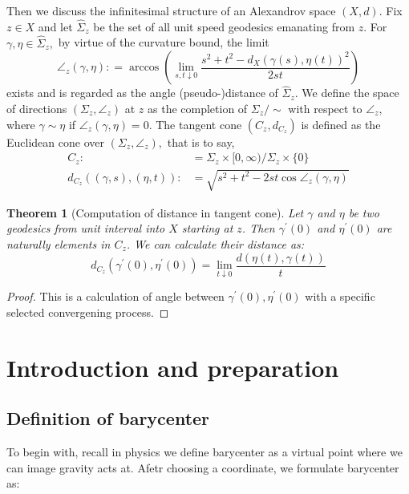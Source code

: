 \documentclass{report}
\newtheorem{thm}{Theorem}
\begin{document}
Then we discuss the infinitesimal structure of an Alexandrov space \( ( X , d ) . \) Fix \( z \in X \)
and let \( \hat { \Sigma } _ { z } \) be the set of all unit speed geodesics emanating from \( z \). For \( \gamma , \eta \in \hat { \Sigma } _ { z } , \) by virtue of the curvature bound, the limit
\[ \angle _ { z } ( \gamma , \eta ): = \arccos \left( \lim _ { s , t \downarrow 0 } \frac { s ^ { 2 } + t ^ { 2 } - d _ { X } ( \gamma ( s ) , \eta ( t ) ) ^ { 2 } } { 2 s t } \right) \]
exists and is regarded as the angle (pseudo-)distance of \( \hat { \Sigma } _ { z } . \) We define the space of directions \( \left( \Sigma _ { z } , \angle _ { z } \right) \) at \( z \) as the completion of \( \Sigma _ { z } / \sim \) with respect to \( \angle _ { z } , \) where \( \gamma \sim \eta \) if \( \angle _ { z } ( \gamma , \eta ) = 0 . \) The tangent cone \( \left( C _ { z } , d _ { C _ { z } } \right) \) is defined as the Euclidean cone over \( \left( \Sigma _ { z } , \angle _ { z } \right) , \)
that is to say,
\begin{align*}
	C _ { z }: &= \Sigma _ { z } \times [ 0 , \infty ) / \Sigma _ { z } \times \{ 0 \} \\
	d _ { C _ { z } } ( ( \gamma , s ) , ( \eta , t ) ): &= \sqrt { s ^ { 2 } + t ^ { 2 } - 2 s t \cos \angle _ { z } ( \gamma , \eta ) }
\end{align*}

\begin{thm}[Computation of distance in tangent cone]
	Let $\gamma$ and  $\eta$ be two geodesics from unit interval into $X$ starting at $z$.  Then $\gamma^\prime(0)$ and $\eta^\prime(0)$ are naturally elements in $C_z$.  We can calculate their distance as:
	\[  d_{C_z}(\gamma^\prime(0),\eta^\prime(0))=\lim _ { t \downarrow 0 } \frac  {d ( \eta ( t ) , \gamma ( t ) )  }{ t }\]
\end{thm}
\begin{proof}
	This is a calculation of angle between $\gamma^\prime(0),\eta^\prime(0)$ with a specific selected convergening process.
\end{proof}
\chapter{Introduction and preparation}
\section{Definition of barycenter}
To begin with, recall in physics we define barycenter as a virtual point where we can image gravity acts at. Afetr choosing a coordinate, we formulate barycenter as:
\end{document}
